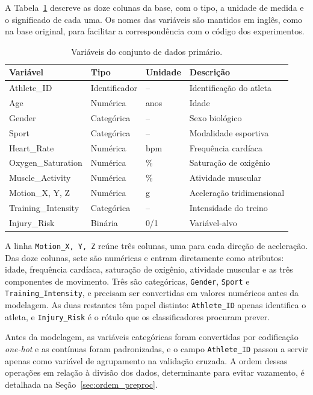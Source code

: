 A Tabela~\ref{tab:variaveis} descreve as doze colunas da base, com o tipo, a unidade de medida e o significado de cada uma. Os nomes das variáveis são mantidos em inglês, como na base original, para facilitar a correspondência com o código dos experimentos.

\begin{table}[H]
\centering
\caption{Variáveis do conjunto de dados primário.}
\label{tab:variaveis}
\begin{tabular}{llll}
\toprule
Variável & Tipo & Unidade & Descrição \\
\midrule
Athlete\_ID & Identificador & -- & Identificação do atleta \\
Age & Numérica & anos & Idade \\
Gender & Categórica & -- & Sexo biológico \\
Sport & Categórica & -- & Modalidade esportiva \\
Heart\_Rate & Numérica & bpm & Frequência cardíaca \\
Oxygen\_Saturation & Numérica & \% & Saturação de oxigênio \\
Muscle\_Activity & Numérica & \% & Atividade muscular \\
Motion\_X, Y, Z & Numérica & g & Aceleração tridimensional \\
Training\_Intensity & Categórica & -- & Intensidade do treino \\
Injury\_Risk & Binária & 0/1 & Variável-alvo \\
\bottomrule
\end{tabular}
\end{table}

A linha \texttt{Motion\_X, Y, Z} reúne três colunas, uma para cada direção de aceleração. Das doze colunas, sete são numéricas e entram diretamente como atributos: idade, frequência cardíaca, saturação de oxigênio, atividade muscular e as três componentes de movimento. Três são categóricas, \texttt{Gender}, \texttt{Sport} e \texttt{Training\_Intensity}, e precisam ser convertidas em valores numéricos antes da modelagem. As duas restantes têm papel distinto: \texttt{Athlete\_ID} apenas identifica o atleta, e \texttt{Injury\_Risk} é o rótulo que os classificadores procuram prever.

Antes da modelagem, as variáveis categóricas foram convertidas por codificação \textit{one-hot} e as contínuas foram padronizadas, e o campo \texttt{Athlete\_ID} passou a servir apenas como variável de agrupamento na validação cruzada. A ordem dessas operações em relação à divisão dos dados, determinante para evitar vazamento, é detalhada na Seção~\ref{sec:ordem_preproc}.

